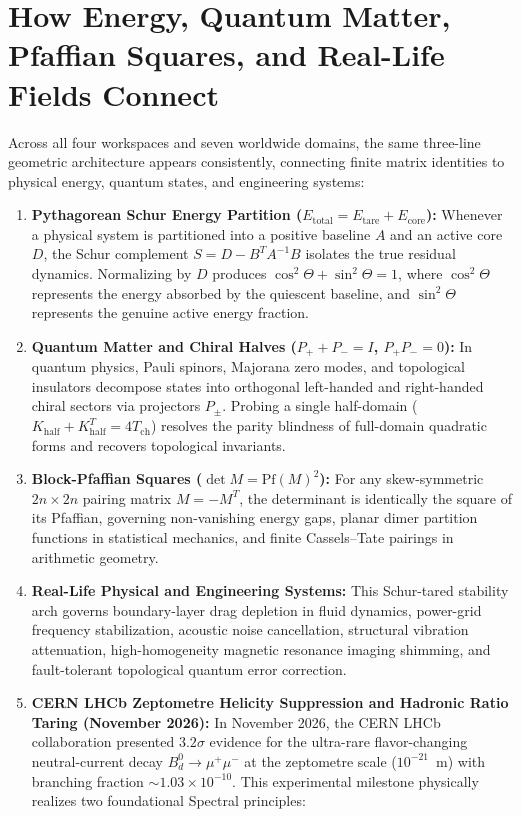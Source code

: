 \documentclass[11pt,a4paper]{article}
\begin{document}
\section{How Energy, Quantum Matter, Pfaffian Squares, and Real-Life Fields Connect}

Across all four workspaces and seven worldwide domains, the same three-line geometric architecture appears consistently, connecting finite matrix identities to physical energy, quantum states, and engineering systems:

\begin{enumerate}
  \item \textbf{Pythagorean Schur Energy Partition ($E_{\mathrm{total}} = E_{\mathrm{tare}} + E_{\mathrm{core}}$):} Whenever a physical system is partitioned into a positive baseline $A$ and an active core $D$, the Schur complement $S = D - B^T A^{-1} B$ isolates the true residual dynamics. Normalizing by $D$ produces $\cos^2\Theta + \sin^2\Theta = 1$, where $\cos^2\Theta$ represents the energy absorbed by the quiescent baseline, and $\sin^2\Theta$ represents the genuine active energy fraction.
  \item \textbf{Quantum Matter and Chiral Halves ($P_+ + P_- = I$, $P_+ P_- = 0$):} In quantum physics, Pauli spinors, Majorana zero modes, and topological insulators decompose states into orthogonal left-handed and right-handed chiral sectors via projectors $P_\pm$. Probing a single half-domain ($K_{\mathrm{half}} + K_{\mathrm{half}}^T = 4 T_{\mathrm{ch}}$) resolves the parity blindness of full-domain quadratic forms and recovers topological invariants.
  \item \textbf{Block-Pfaffian Squares ($\det M = \mathrm{Pf}(M)^2$):} For any skew-symmetric $2n \times 2n$ pairing matrix $M = -M^T$, the determinant is identically the square of its Pfaffian, governing non-vanishing energy gaps, planar dimer partition functions in statistical mechanics, and finite Cassels--Tate pairings in arithmetic geometry.
  \item \textbf{Real-Life Physical and Engineering Systems:} This Schur-tared stability arch governs boundary-layer drag depletion in fluid dynamics, power-grid frequency stabilization, acoustic noise cancellation, structural vibration attenuation, high-homogeneity magnetic resonance imaging shimming, and fault-tolerant topological quantum error correction.
  \item \textbf{CERN LHCb Zeptometre Helicity Suppression and Hadronic Ratio Taring (November 2026):} In November 2026, the CERN LHCb collaboration presented $3.2\sigma$ evidence for the ultra-rare flavor-changing neutral-current decay $B_d^0 \to \mu^+ \mu^-$ at the zeptometre scale ($10^{-21}$~m) with branching fraction $\sim 1.03 \times 10^{-10}$. This experimental milestone physically realizes two foundational Spectral principles:

\end{enumerate}
\end{document}

